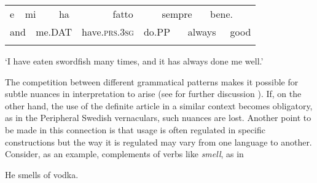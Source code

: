 \begin{tabular}{llllllllllll}
\lsptoprule
e & \multicolumn{2}{l}{mi

} & \multicolumn{2}{l}{ha

} & \multicolumn{2}{l}{fatto

} & \multicolumn{2}{l}{sempre

} & \multicolumn{2}{l}{bene.

} & \\
\multicolumn{2}{l}{and

} & \multicolumn{2}{l}{me.DAT

} & \multicolumn{2}{l}{have.\textsc{prs.3sg}

} & \multicolumn{2}{l}{do.PP

} & \multicolumn{2}{l}{always

} & \multicolumn{2}{l}{good

}\\
\lspbottomrule
\end{tabular}

\begin{styleTranslation}
‘I have eaten swordfish many times, and it has always done me well.’

\end{styleTranslation}

\begin{styleBodytextC}
The competition between different grammatical patterns makes it possible for subtle nuances in interpretation to arise (see for further discussion \citet[128-134]{Dahl2004}). If, on the other hand, the use of the definite article in a similar context becomes obligatory, as in the Peripheral Swedish vernaculars, such nuances are lost. Another point to be made in this connection is that usage is often regulated in specific constructions but the way it is regulated may vary from one language to another. Consider, as an example, complements of verbs like \textit{smell}, as in

\end{styleBodytextC}


\begin{listWWNumileveli}
\item 

\begin{styleExample}
He smells of vodka.

\end{styleExample}

\end{listWWNumileveli}

